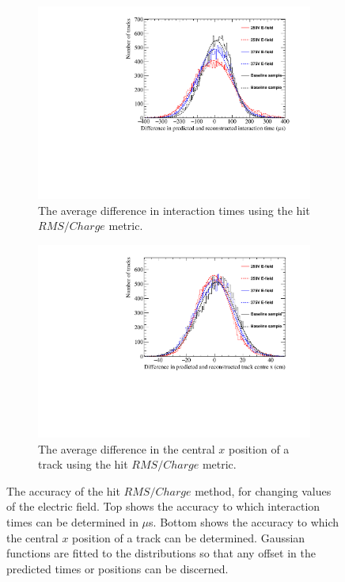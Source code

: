 \begin{figure}[h!]
  \centering
  \begin{subfigure}{0.6\textwidth}
    \centering
    \includegraphics[width=\textwidth]{Canvas_AvDiff_T_RMS_Q_ElecField}
    \caption{The average difference in interaction times using the hit $RMS/Charge$ metric.}
    \label{fig:DiffElecStudy_AvDiff_RMS_Int_T}
  \end{subfigure}
  \begin{subfigure}{0.6\textwidth}
    \centering
    \includegraphics[width=\textwidth]{Canvas_AvDiff_X_RMS_Q_ElecField}
    \caption{The average difference in the central $x$ position of a track using the hit $RMS/Charge$ metric.}
    \label{fig:DiffElecStudy_AvDiff_RMS_Int_X}
  \end{subfigure}
  \caption[Comparing the accuracy of the hit $RMS$ method, as the electric field changes]
          {The accuracy of the hit $RMS/Charge$ method, for changing values of the electric field. Top shows the accuracy to which interaction times can be determined in $\mu$s. Bottom shows the accuracy to which the central $x$ position of a track can be determined. Gaussian functions are fitted to the distributions so that any offset in the predicted times or positions can be discerned.}
  \label{fig:DiffElecStudy_AvDiff_RMS_Int}
\end{figure}

